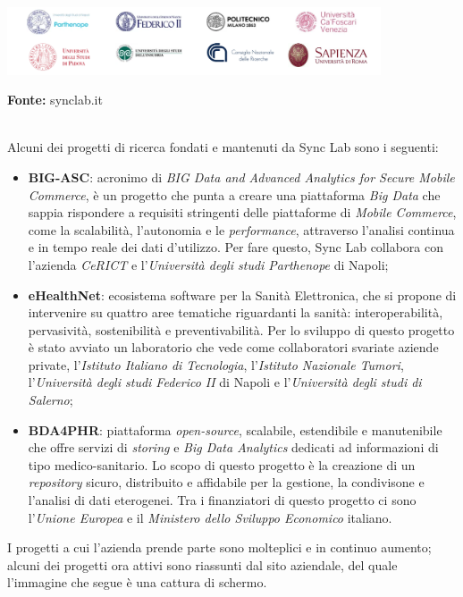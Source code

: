 \begin{minipage}{\linewidth}
  \centering
    \includegraphics[height=2cm]{immagini/universita}
  \caption*{\textbf{Fonte:} synclab.it}
\end{minipage} \\

Alcuni dei progetti di ricerca fondati e mantenuti da Sync Lab sono i seguenti:
\begin{itemize}
  \item \textbf{BIG-ASC}: acronimo di \textit{BIG Data and Advanced Analytics for Secure Mobile Commerce}, è un progetto che punta a creare una piattaforma \textit{Big Data} che sappia rispondere a requisiti stringenti delle piattaforme di \textit{Mobile Commerce}, come la scalabilità, l'autonomia e le \textit{performance}, attraverso l'analisi continua e in tempo reale dei dati d'utilizzo. Per fare questo, Sync Lab collabora con l'azienda \textit{CeRICT} e l'\textit{Università degli studi Parthenope} di Napoli;
  \item \textbf{eHealthNet}: ecosistema software per la Sanità Elettronica, che si propone di intervenire su quattro aree tematiche riguardanti la sanità: interoperabilità, pervasività, sostenibilità e preventivabilità. Per lo sviluppo di questo progetto è stato avviato un laboratorio che vede come collaboratori svariate aziende private, l'\textit{Istituto Italiano di Tecnologia}, l'\textit{Istituto Nazionale Tumori}, l'\textit{Università degli studi Federico II} di Napoli e l'\textit{Università degli studi di Salerno};
  \item \textbf{BDA4PHR}: piattaforma \textit{open-source}, scalabile, estendibile e manutenibile che offre servizi di \textit{storing} e \textit{Big Data Analytics} dedicati ad informazioni di tipo medico-sanitario. Lo scopo di questo progetto è la creazione di un \textit{repository} sicuro, distribuito e affidabile per la gestione, la condivisone e l'analisi di dati eterogenei. Tra i finanziatori di questo progetto ci sono l'\textit{Unione Europea} e il \textit{Ministero dello Sviluppo Economico} italiano. \\
\end{itemize}

I progetti a cui l'azienda prende parte sono molteplici e in continuo aumento; alcuni dei progetti ora attivi sono riassunti dal sito aziendale, del quale l'immagine che segue è una cattura di schermo.

